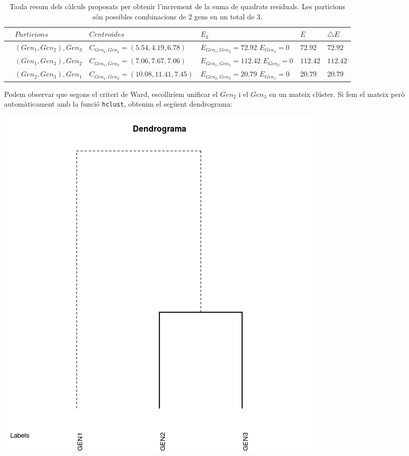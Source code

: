 \documentclass[english]{article}
\begin{document}
\begin{table}[ht]
\onecolumn
\centering
\begin{tabularx}{\linewidth}{llllll}
\hline
& $Particions$ & $Centroides$ & $E_k$ & $E$ & $\bigtriangleup E$ \\
\hline
& $(Gen_1,Gen_2),Gen_3$ & $C_{Gen_1,Gen_2} = (5.54,4.19,6.78) $ & $E_{Gen_1,Gen_2}=72.92$
$E_{Gen_3}=0$ & $72.92$ & $72.92$ \\
& $(Gen_1,Gen_3),Gen_2$ & $C_{Gen_1,Gen_2} = (7.06,7.67,7.06) $ & $E_{Gen_1,Gen_3}=112.42$
$E_{Gen_2}=0$ & $112.42$ & $112.42$ \\
& $(Gen_2,Gen_3),Gen_1$ & $C_{Gen_1,Gen_2} = (10.08,11.41,7.45)$ & $E_{Gen_2,Gen_3}=20.79$
$E_{Gen_1}=0$ & $20.79$ & $20.79$ \\
\hline
\end{tabularx}
\caption{Taula resum dels càlculs proposats per obtenir l'increment de la suma de quadrats residuals. Les particions són possibles combinacions de 2 gens en un total de 3.}
\end{table}

\noindent Podem observar que segons el criteri de Ward, escolliríem unificar el $Gen_2$ i el $Gen_3$ en un mateix clúster. Si fem el mateix però automàticament amb la funció \texttt{hclust}, obtenim el següent dendrograma:
\begin{center}
\includegraphics[scale=0.4]{dendrograma.png}
\end{center}
\end{document}
